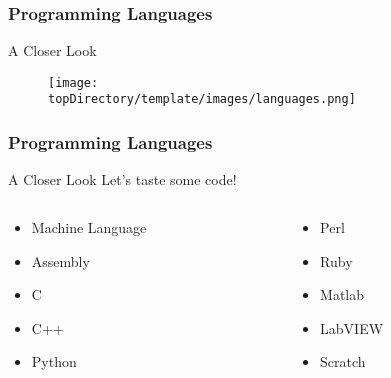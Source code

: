 \documentclass[10pt, compress]{beamer}
\begin{document}
\begin{frame}[fragile]
	\frametitle{Programming Languages}
	\begin{block}{A Closer Look}
		\begin{figure}\centering
			\texttt{[image: \\topDirectory/template/images/languages.png]}
		\end{figure}
	\end{block}
\end{frame}

\begin{frame}[fragile]
	\frametitle{Programming Languages}
	\begin{block}{A Closer Look}
		Let's taste some code!
		\begin{columns}
			\begin{column}{0.5\textwidth}
			\begin{itemize}
				\item[] Machine Language
				\item[] Assembly
				\item[] C
				\item[] C++
				\item[] Python
			\end{itemize}
			\end{column}
			\begin{column}{0.5\textwidth}
			\begin{itemize}
				\item[] Perl
				\item[] Ruby
				\item[] Matlab
				\item[] LabVIEW
				\item[] Scratch
			\end{itemize}
			\end{column}
		\end{columns}
	\end{block}
\end{frame}

\end{document}
